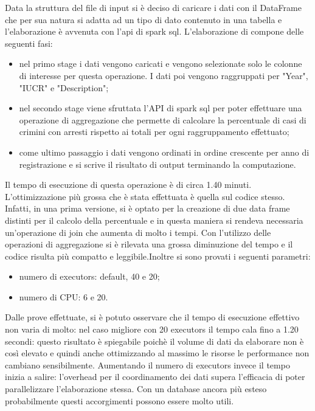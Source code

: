 \documentclass[10pt]{article}
\begin{document}
Data la struttura del file di input si è deciso di caricare i dati con il DataFrame che per sua natura si adatta ad un tipo di dato contenuto in una tabella e l'elaborazione è avvenuta con l'api di spark sql.
L'elaborazione di compone delle seguenti fasi:
\begin{itemize}
\item nel primo stage i dati vengono caricati e vengono selezionate solo le colonne di interesse per questa operazione. I dati poi vengono raggruppati per "Year", "IUCR" e "Description";
\item nel secondo stage viene sfruttata l'API di spark sql per poter effettuare una operazione di aggregazione che permette di calcolare la percentuale di casi di crimini con arresti rispetto ai totali per ogni raggruppamento effettuato;
\item come ultimo passaggio i dati vengono ordinati in ordine crescente per anno di registrazione e si scrive il risultato di output terminando la computazione.
\end{itemize}

Il tempo di esecuzione di questa operazione è di circa 1.40 minuti.
L'ottimizzazione più grossa che è stata effettuata è quella sul codice stesso. Infatti, in una prima versione, si è optato per la creazione di due data frame distinti per il calcolo della percentuale e in questa maniera si rendeva necessaria un'operazione di join che aumenta di molto i tempi. Con l'utilizzo delle operazioni di aggregazione si è rilevata una grossa diminuzione del tempo e il codice risulta più compatto e leggibile.Inoltre si sono provati i seguenti parametri:
\begin{itemize}
\item numero di executors: default, 40 e 20;
\item numero di CPU: 6 e 20.
\end{itemize}
Dalle prove effettuate, si è potuto osservare che il tempo di esecuzione effettivo non varia di molto: nel caso migliore con 20 executors il tempo cala fino a 1.20 secondi: questo risultato è spiegabile poichè il volume di dati da elaborare non è così elevato e quindi anche ottimizzando al massimo le risorse le performance non cambiano sensibilmente. Aumentando il numero di executors invece il tempo inizia a salire: l'overhead per il coordinamento dei dati supera l'efficacia di poter parallelizzare l'elaborazione stessa. Con un database ancora più esteso probabilmente questi accorgimenti possono essere molto utili. 

\end{document}
